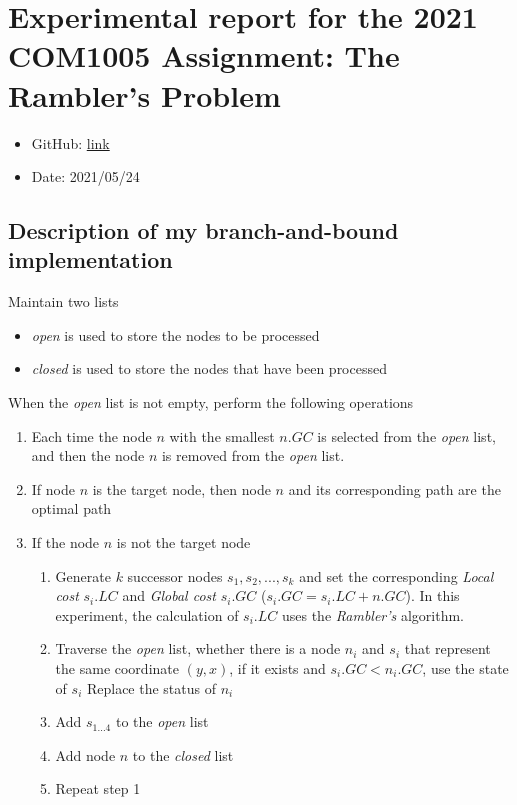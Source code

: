 \documentclass[
]{article}
\author{}
\date{}
\begin{document}
\hypertarget{header-n0}{%
\section{Experimental report for the 2021 COM1005 Assignment: The
Rambler's Problem}\label{header-n0}}

\begin{itemize}
\item
  GitHub:
  \href{https://github.com/JiaaoWang04/COM1005_Assignment_Report.git}{link}
\item
  Date: 2021/05/24
\end{itemize}

\hypertarget{header-n7}{%
\subsection{Description of my branch-and-bound
implementation}\label{header-n7}}

Maintain two lists

\begin{itemize}
\item
  \emph{open} is used to store the nodes to be processed
\item
  \emph{closed} is used to store the nodes that have been processed
\end{itemize}

When the \emph{open} list is not empty, perform the following operations

\begin{enumerate}
\def\labelenumi{\arabic{enumi}.}
\item
  Each time the node \(n\) with the smallest \(n.GC\) is selected from
  the \emph{open} list, and then the node \(n\) is removed from the
  \emph{open} list.
\item
  If node \(n\) is the target node, then node \(n\) and its
  corresponding path are the optimal path
\item
  If the node \(n\) is not the target node

  \begin{enumerate}
  \def\labelenumii{\arabic{enumii}.}
  \item
    Generate \(k\) successor nodes \(s_1, s_2, ..., s_k\) and set the
    corresponding \emph{Local cost} \(s_i.LC\) and \emph{Global cost}
    \(s_i.GC\) (\(s_i.GC = s_i. LC + n.GC\)). In this experiment, the
    calculation of \(s_i.LC\) uses the \emph{Rambler's} algorithm.
  \item
    Traverse the \emph{open} list, whether there is a node \(n_i\) and
    \(s_i\) that represent the same coordinate \((y, x)\), if it exists
    and \(s_i.GC <n_i.GC\), use the state of \(s_i\) Replace the status
    of \(n_i\)
  \item
    Add \(s_{1...4}\) to the \emph{open} list
  \item
    Add node \(n\) to the \emph{closed} list
  \item
    Repeat step 1
  \end{enumerate}
\end{enumerate}
\end{document}
